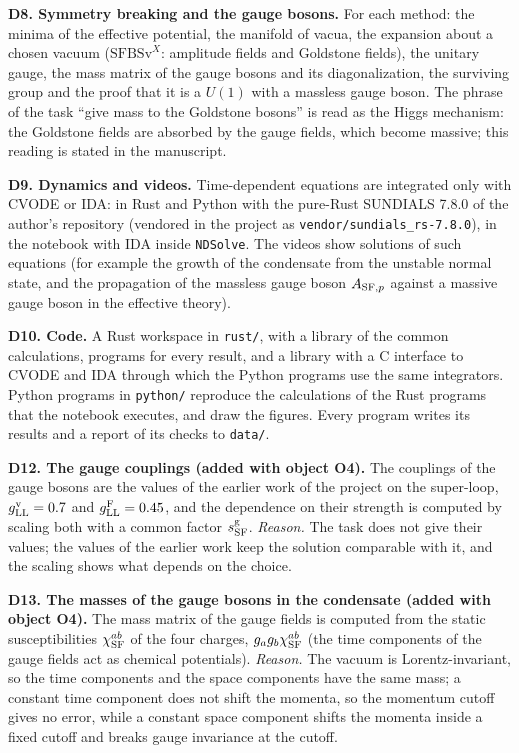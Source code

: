 \documentclass[
  10pt,
]{article}
\begin{document}
\textbf{D8. Symmetry breaking and the gauge bosons.} For each method:
the minima of the effective potential, the manifold of vacua, the
expansion about a chosen vacuum (\(\mathrm{SFBSv}^X\): amplitude fields
and Goldstone fields), the unitary gauge, the mass matrix of the gauge
bosons and its diagonalization, the surviving group and the proof that
it is a \(U(1)\) with a massless gauge boson. The phrase of the task
``give mass to the Goldstone bosons'' is read as the Higgs mechanism:
the Goldstone fields are absorbed by the gauge fields, which become
massive; this reading is stated in the manuscript.

\textbf{D9. Dynamics and videos.} Time-dependent equations are
integrated only with CVODE or IDA: in Rust and Python with the pure-Rust
SUNDIALS 7.8.0 of the author's repository (vendored in the project as
\texttt{vendor/sundials\_rs-7.8.0}), in the notebook with IDA inside
\texttt{NDSolve}. The videos show solutions of such equations (for
example the growth of the condensate from the unstable normal state, and
the propagation of the massless gauge boson \(A_{{\rm SF},p}\) against a
massive gauge boson in the effective theory).

\textbf{D10. Code.} A Rust workspace in \texttt{rust/}, with a library
of the common calculations, programs for every result, and a library
with a C interface to CVODE and IDA through which the Python programs
use the same integrators. Python programs in \texttt{python/} reproduce
the calculations of the Rust programs that the notebook executes, and
draw the figures. Every program writes its results and a report of its
checks to \texttt{data/}.

\textbf{D12. The gauge couplings (added with object O4).} The couplings
of the gauge bosons are the values of the earlier work of the project on
the super-loop, \(g^{\rm v}_{\rm LL}=0.7\) and
\(g^{\rm F}_{\rm LL}=0.45\), and the dependence on their strength is
computed by scaling both with a common factor \(s^{\rm g}_{\rm SF}\).
\emph{Reason.} The task does not give their values; the values of the
earlier work keep the solution comparable with it, and the scaling shows
what depends on the choice.

\textbf{D13. The masses of the gauge bosons in the condensate (added
with object O4).} The mass matrix of the gauge fields is computed from
the static susceptibilities \(\chi^{ab}_{\rm SF}\) of the four charges,
\(g_ag_b\chi^{ab}_{\rm SF}\) (the time components of the gauge fields
act as chemical potentials). \emph{Reason.} The vacuum is
Lorentz-invariant, so the time components and the space components have
the same mass; a constant time component does not shift the momenta, so
the momentum cutoff gives no error, while a constant space component
shifts the momenta inside a fixed cutoff and breaks gauge invariance at
the cutoff.
\end{document}
